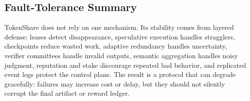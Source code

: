 \documentclass{article}
\theoremstyle{plain}
\begin{document}
\subsection{Fault-Tolerance Summary}

TokenShare does not rely on one mechanism. Its stability comes from layered defense: leases detect disappearance, speculative execution handles stragglers, checkpoints reduce wasted work, adaptive redundancy handles uncertainty, verifier committees handle invalid outputs, semantic aggregation handles noisy judgment, reputation and stake discourage repeated bad behavior, and replicated event logs protect the control plane. The result is a protocol that can degrade gracefully: failures may increase cost or delay, but they should not silently corrupt the final artifact or reward ledger.




\end{document}
